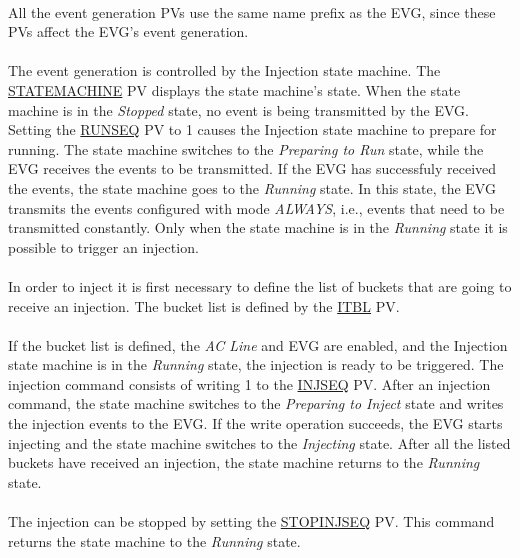 \documentclass[openany]{article}
\begin{document}
		\paragraph{} All the event generation PVs use the same name prefix as the EVG, since these PVs affect the EVG's event generation.
		\paragraph{} The event generation is controlled by the Injection state machine. The \hyperref[pvgroup:evg-injection]{STATEMACHINE} PV displays the state machine's state. When the state machine is in the \emph{Stopped} state, no event is being transmitted by the EVG. Setting the \hyperref[pvgroup:evg-injection]{RUNSEQ} PV to 1 causes the Injection state machine to prepare for running. The state machine switches to the \emph{Preparing to Run} state, while the EVG receives the events to be transmitted. If the EVG has successfuly received the events, the state machine goes to the \emph{Running} state. In this state, the EVG transmits the events configured with mode \emph{ALWAYS}, i.e., events that need to be transmitted constantly. Only when the state machine is in the \emph{Running} state it is possible to trigger an injection.
		\paragraph{} In order to inject it is first necessary to define the list of buckets that are going to receive an injection. The bucket list is defined by the \hyperref[pvgroup:evg-injection]{ITBL} PV.
		\paragraph{} If the bucket list is defined, the \emph{AC Line} and EVG are enabled, and the Injection state machine is in the \emph{Running} state, the injection is ready to be triggered. The injection command consists of writing 1 to the \hyperref[pvgroup:evg-injection]{INJSEQ} PV. After an injection command, the state machine switches to the \emph{Preparing to Inject} state and writes the injection events to the EVG. If the write operation succeeds, the EVG starts injecting and the state machine switches to the \emph{Injecting} state. After all the listed buckets have received an injection, the state machine returns to the \emph{Running} state.
		\paragraph{} The injection can be stopped by setting the \hyperref[pvgroup:evg-event]{STOPINJSEQ} PV. This command returns the state machine to the \emph{Running} state.
\end{document}
